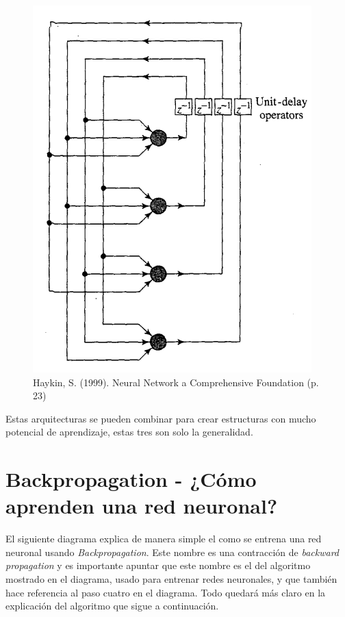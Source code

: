 \documentclass[14pt,a4paper]{report}
\begin{document}
\begin{enumerate}
  \begin{figure}[h]
  \centering
  \includegraphics[scale=0.6]{../recurrent-NN.png} 
  \caption{Haykin, S. (1999). Neural Network a Comprehensive Foundation (p. 23)}
  \label{fig:neural-network}
\end{figure}


Estas arquitecturas se pueden combinar para crear estructuras con mucho potencial de aprendizaje, estas tres son solo la generalidad.
\end{enumerate}

\section*{Backpropagation - ¿Cómo aprenden una red neuronal?}

El siguiente diagrama explica de manera simple el como se entrena una red neuronal usando \textit{Backpropagation}. Este nombre es una contracción de \textit{backward propagation} y es importante apuntar que este nombre es el del algoritmo mostrado en el diagrama, usado para entrenar redes neuronales, y que también hace referencia al paso cuatro en el diagrama. Todo quedará más claro en la explicación del algoritmo que sigue a continuación.
\end{document}
